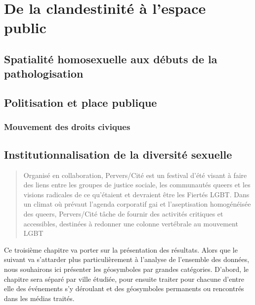
\chapter{De la clandestinité à l'espace public}
\label{cha:de_la_clandestinite_a_l_espace_public}

\section{Spatialité homosexuelle aux débuts de la pathologisation}
\label{sec:spatialit_homosexuelle_aux_d_buts_de_la_pathologisation}

\section{Politisation et place publique}
\label{sec:politisation_et_place_publique}



\subsection{Mouvement des droits civiques}
\label{sub:mouvement_des_droits_civiques}

\section{Institutionnalisation de la diversité sexuelle}
\label{sec:institutionnalisation_de_la_diversit_sexuelle}

\blockquote[{\cite{Pervers/Cite2015}}][.]{Organisé en collaboration,  Pervers/Cité est un festival d’été visant à faire des liens entre les groupes de justice sociale, les communautés queers et les visions radicales de ce qu'étaient et devraient être les Fiertés LGBT\@.
Dans un climat où prévaut l’agenda corporatif gai et l’aseptisation homogénéisée des queers, Pervers/Cité tâche de fournir des activités critiques et accessibles, destinées à redonner une colonne vertébrale au mouvement LGBT}.
Ce troisième chapitre va porter sur la présentation des résultats.
Alors que le suivant va s'attarder plus particulièrement à l'analyse de l'ensemble des données, nous souhairons ici présenter les géosymboles par grandes catégories.
D'abord, le chapitre sera séparé par ville étudiée, pour ensuite traiter pour chacune d'entre elle des événements s'y déroulant et des géosymboles permanents ou rencontrés dans les médias traités.

